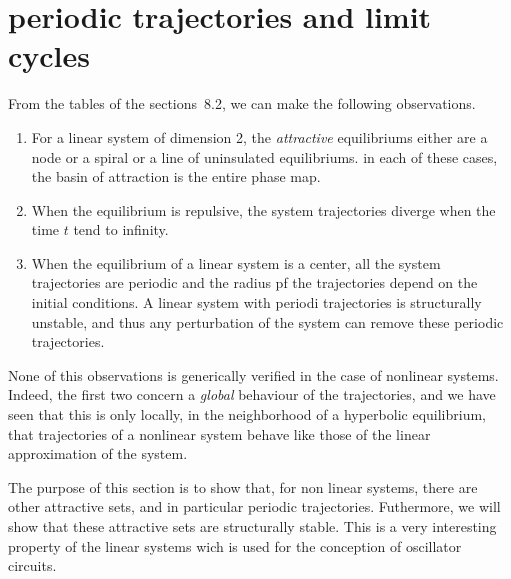 \section{periodic trajectories and limit cycles}

From the tables of the sections~8.2, we can make the following observations.
\begin{enumerate}
\item For a linear system of dimension 2, the {\em attractive} equilibriums either are a node or a spiral or a line of uninsulated equilibriums. in
each of these cases, the basin of attraction is the entire phase map.
\item When the equilibrium is repulsive, the system trajectories diverge when the time $t$ tend to infinity.
\item When the equilibrium of a linear system is a center, all the system trajectories are periodic and the radius pf the trajectories depend on the initial conditions.
A linear system with periodi trajectories is structurally unstable, and thus any perturbation of the system can remove these periodic trajectories.
\end{enumerate}
None of this observations is generically verified in the case of nonlinear systems. Indeed, the first two concern a {\em global} behaviour of the trajectories, and we have seen that this is only locally, in the neighborhood of a hyperbolic equilibrium, that
trajectories of a nonlinear system behave like those of the linear approximation of the system.

The purpose of this section is to show that, for non linear systems, there are other attractive sets, and in particular periodic trajectories.
Futhermore, we will show that these attractive sets are structurally stable. This is a very interesting property of the linear systems wich is used for the conception of oscillator circuits.

